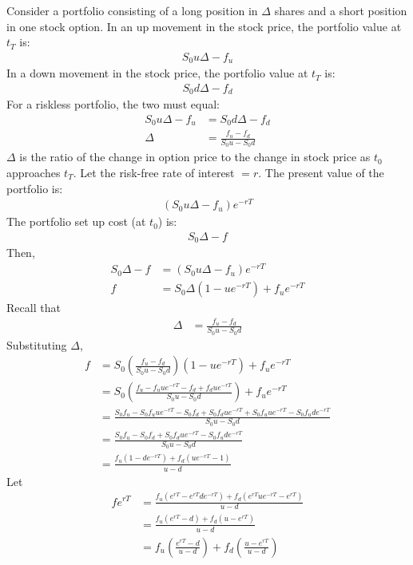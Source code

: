 \documentclass[12pt]{article}
\begin{document}
Consider a portfolio consisting of a long position in $\Delta$ shares and a short position in one stock option. In an up movement in the stock price, the portfolio value at $t_{T}$ is:
\begin{align*}
S_{0}u\Delta-f_{u}
\end{align*}
In a down movement in the stock price, the portfolio value at $t_{T}$ is:
\begin{align*}
S_{0}d\Delta-f_{d}
\end{align*}
For a riskless portfolio, the two must equal:
\begin{align*}
S_{0}u\Delta-f_{u}&=S_{0}d\Delta-f_{d}\\
\Delta&=\frac{f_{u}-f_{d}}{S_{0}u-S_{0}d}
\end{align*}
$\Delta$ is the ratio of the change in option price to the change in stock price as $t_{0}$ approaches $t_{T}$. Let the risk-free rate of interest $=r$. The present value of the portfolio is:
\begin{align*}
(S_{0}u\Delta-f_{u})e^{-rT}
\end{align*}
The portfolio set up cost (at $t_{0}$) is:
\begin{align*}
S_{0}\Delta-f
\end{align*}
Then,
\begin{align*}
S_{0}\Delta-f&=(S_{0}u\Delta-f_{u})e^{-rT}\\
f&=S_{0}\Delta(1-ue^{-rT})+f_{u}e^{-rT}
\end{align*}
Recall that
\begin{align*}
\Delta&=\frac{f_{u}-f_{d}}{S_{0}u-S_{0}d}
\end{align*}
Substituting $\Delta$,
\begin{align*}
f&=S_{0}\left(\frac{f_{u}-f_{d}}{S_{0}u-S_{0}d}\right)(1-ue^{-rT})+f_{u}e^{-rT}\\
&=S_{0}\left(\frac{f_{u}-f_{u}ue^{-rT}-f_{d}+f_{d}ue^{-rT}}{S_{0}u-S_{0}d}\right)+f_{u}e^{-rT}\\
&=\frac{S_{0}f_{u}-S_{0}f_{u}ue^{-rT}-S_{0}f_{d}+S_{0}f_{d}ue^{-rT}+S_{0}f_{u}ue^{-rT}-S_{0}f_{u}de^{-rT}}{S_{0}u-S_{0}d}\\
&=\frac{S_{0}f_{u}-S_{0}f_{d}+S_{0}f_{d}ue^{-rT}-S_{0}f_{u}de^{-rT}}{S_{0}u-S_{0}d}\\
&=\frac{f_{u}(1-de^{-rT})+f_{d}(ue^{-rT}-1)}{u-d}
\end{align*}
Let
\begin{align*}
fe^{rT}&=\frac{f_{u}(e^{rT}-e^{rT}de^{-rT})+f_{d}(e^{rT}ue^{-rT}-e^{rT})}{u-d}\\
&=\frac{f_{u}(e^{rT}-d)+f_{d}(u-e^{rT})}{u-d}\\
&=f_{u}\left(\frac{e^{rT}-d}{u-d}\right)+f_{d}\left(\frac{u-e^{rT}}{u-d}\right)
\end{align*}
\end{document}
